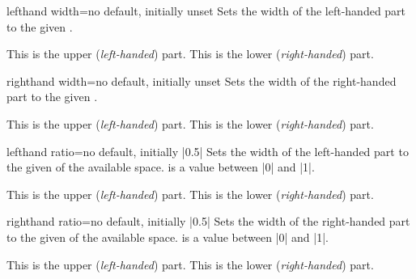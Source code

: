 \begin{docTcbKey}{lefthand width}{=}{no default, initially unset}
Sets the width of the left-handed part to the given .
\begin{dispExample}

\begin{tcolorbox}[title=My title,sidebyside,lefthand width=3cm]
This is the upper (\textit{left-handed}) part.
\tcblower
This is the lower (\textit{right-handed}) part.
\end{tcolorbox}
\end{dispExample}
\end{docTcbKey}

\enlargethispage*{1cm}
\begin{docTcbKey}{righthand width}{=}{no default, initially unset}
Sets the width of the right-handed part to the given .
\begin{dispExample}

\begin{tcolorbox}[title=My title,sidebyside,righthand width=3cm]
This is the upper (\textit{left-handed}) part.
\tcblower
This is the lower (\textit{right-handed}) part.
\end{tcolorbox}
\end{dispExample}
\end{docTcbKey}

\clearpage
\begin{docTcbKey}{lefthand ratio}{=}{no default, initially |0.5|}
Sets the width of the left-handed part to the given  of
the available space.  is a value between |0| and |1|.
\begin{dispExample}

\begin{tcolorbox}[title=My title,sidebyside,lefthand ratio=0.25]
This is the upper (\textit{left-handed}) part.
\tcblower
This is the lower (\textit{right-handed}) part.
\end{tcolorbox}
\end{dispExample}
\end{docTcbKey}


\begin{docTcbKey}{righthand ratio}{=}{no default, initially |0.5|}
Sets the width of the right-handed part to the given  of
the available space.  is a value between |0| and |1|.
\begin{dispExample}

\begin{tcolorbox}[title=My title,sidebyside,righthand ratio=0.25]
This is the upper (\textit{left-handed}) part.
\tcblower
This is the lower (\textit{right-handed}) part.
\end{tcolorbox}
\end{dispExample}
\end{docTcbKey}


